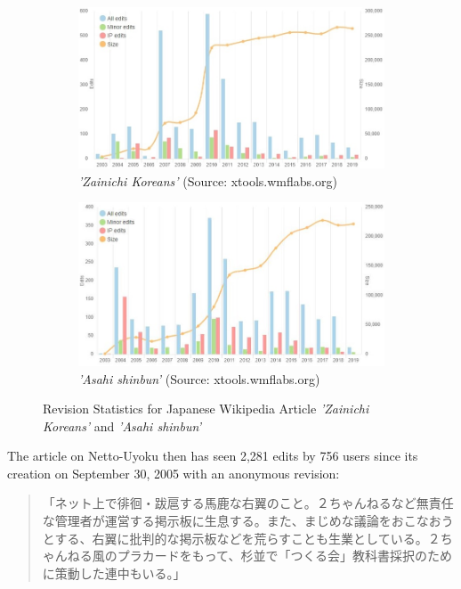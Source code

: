 \documentclass[10pt,british,A4paper,,openany]{memoir}
\begin{document}
\begin{figure}[!htb]
 \centering
 \begin{subfigure}[b]{0.49\textwidth}
  \includegraphics[width=\textwidth]{images/wiki/zainichi.jpg}
  \caption{\textit{'Zainichi Koreans'} (Source: xtools.wmflabs.org)}
  \label{fig:xtools-zainichi}
 \end{subfigure}
  \begin{subfigure}[b]{0.49\textwidth}
  \includegraphics[width=\textwidth]{images/wiki/asahi-shimbun.jpg}
  \caption{\textit{'Asahi shinbun'} (Source: xtools.wmflabs.org)}
  \label{fig:xtools-asahi}
 \end{subfigure}
 \caption{Revision Statistics for Japanese Wikipedia Article \textit{'Zainichi Koreans'} and \textit{'Asahi shinbun'}}\label{fig:xtools}
\end{figure}

The article on Netto-Uyoku then has seen 2,281 edits by 756 users since
its creation on September 30, 2005 with an anonymous revision:

\begin{quote}
「ネット上で徘徊・跋扈する馬鹿な右翼のこと。２ちゃんねるなど無責任な管理者が運営する掲示板に生息する。また、まじめな議論をおこなおうとする、右翼に批判的な掲示板などを荒らすことも生業としている。２ちゃんねる風のプラカードをもって、杉並で「つくる会」教科書採択のために策動した連中もいる。」
\end{quote}
\end{document}
